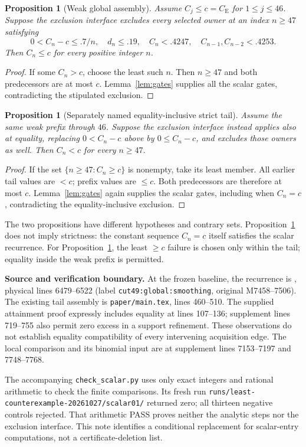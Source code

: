 \documentclass[11pt,a4paper]{article}
\newtheorem{proposition}[lemma]{Proposition}
\newcommand{\CE}{C_{\mathrm E}}
\begin{document}
\begin{proposition}[Weak global assembly]\label{prop:weak}
Assume $C_j\le c=\CE$ for $1\le j\le46$. Suppose the exclusion interface
excludes every selected owner at an index $n\ge47$ satisfying
\[
 0<C_n-c\le.7/n,\quad d_n\le.19,\quad
 C_n<.4247,\quad C_{n-1},C_{n-2}<.4253.
\]
Then $C_n\le c$ for every positive integer $n$.
\end{proposition}
\begin{proof}
If some $C_n>c$, choose the least such $n$. Then $n\ge47$ and both
predecessors are at most $c$. Lemma~\ref{lem:gates} supplies all the
scalar gates, contradicting the stipulated exclusion.
\end{proof}

\begin{proposition}[Separately named equality-inclusive strict tail]
\label{prop:strict}
Assume the same weak prefix through $46$. Suppose the exclusion interface
instead applies also at equality, replacing $0<C_n-c$ above by
$0\le C_n-c$, and excludes those owners as well.
Then $C_n<c$ for every $n\ge47$.
\end{proposition}
\begin{proof}
If the set $\{n\ge47:C_n\ge c\}$ is nonempty, take its least member.
All earlier tail values are $<c$; prefix values are $\le c$.
Both predecessors are therefore at most $c$.
Lemma~\ref{lem:gates} again supplies the scalar gates, including when
$C_n=c$, contradicting the equality-inclusive exclusion.
\end{proof}

The two propositions have different hypotheses and contrary sets.
Proposition~\ref{prop:weak} does not imply strictness: the constant
sequence $C_n=c$ itself satisfies the scalar recurrence.
For Proposition~\ref{prop:strict}, the least $\ge c$ failure is chosen
only within the tail; equality inside the weak prefix is permitted.

\smallskip
\noindent\textbf{Source and verification boundary.}
At the frozen baseline, the recurrence is
, physical lines 6479--6522
(label \texttt{cut49:global:smoothing}, original M7458--7506).
The existing tail assembly is \texttt{paper/main.tex}, lines 460--510.
The supplied attainment proof expressly includes equality at lines
107--136; supplement lines 719--755 also permit zero excess in a support
refinement. These observations do not establish equality compatibility
of every intervening acquisition edge. The local comparison and its
binomial input are at supplement lines 7153--7197 and 7748--7768.

The accompanying \texttt{check\_scalar.py} uses only exact integers and
rational arithmetic to check the finite comparisons. Its fresh run
\texttt{runs/least-counterexample-20261027/scalar01/} returned zero;
all thirteen negative controls rejected. That arithmetic PASS proves
neither the analytic steps nor the exclusion interface. This note
identifies a conditional replacement for scalar-entry computations,
not a certificate-deletion list.
\end{document}
